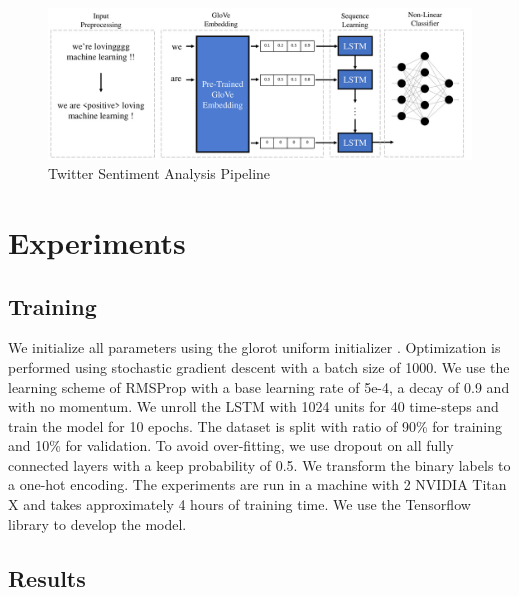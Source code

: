 \documentclass[10pt,conference,compsocconf]{IEEEtran}
\begin{document}
\begin{figure}[t]
\begin{center}
  \includegraphics[width=\textwidth]{ML.pdf}
  \caption{Twitter Sentiment Analysis Pipeline}
  \label{fig:pipeline}
\end{center}
\end{figure}


\section{Experiments}

\subsection{Training}
We initialize all parameters using the glorot uniform initializer \cite{glorot}. Optimization is performed using stochastic gradient descent with a batch size of 1000. We use the learning scheme of RMSProp \cite{rmsprop} with a base learning rate of 5e-4, a decay of 0.9 and with no momentum. We unroll the LSTM with 1024 units for 40 time-steps and train the model for 10 epochs. The dataset is split with ratio of 90\% for training and 10\% for validation. To avoid over-fitting, we use dropout \cite{dropout} on all fully connected layers with a keep probability of 0.5. We transform the binary labels to a one-hot encoding. The experiments are run in a machine with 2 NVIDIA Titan X and takes approximately 4 hours of training time. We use the Tensorflow library \cite{tf} to develop the model. 

\subsection{Results}
\end{document}
